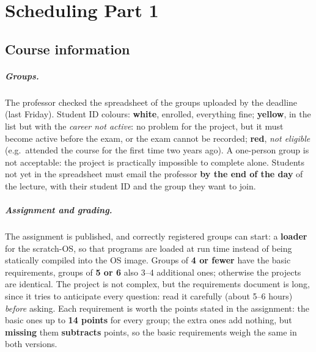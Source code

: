 \chapter{Scheduling Part 1}

\section{Course information}
\paragraph{Groups.} The professor checked the spreadsheet of the groups uploaded by the deadline (last Friday). Student ID colours: \textbf{white}, enrolled, everything fine; \textbf{yellow}, in the list but with the \emph{career not active}: no problem for the project, but it must become active before the exam, or the exam cannot be recorded; \textbf{red}, \emph{not eligible} (e.g.\ attended the course for the first time two years ago). A one-person group is not acceptable: the project is practically impossible to complete alone. Students not yet in the spreadsheet must email the professor \textbf{by the end of the day} of the lecture, with their student ID and the group they want to join.

\paragraph{Assignment and grading.} The assignment is published, and correctly registered groups can start: a \textbf{loader} for the scratch-OS, so that programs are loaded at run time instead of being statically compiled into the OS image. Groups of \textbf{4 or fewer} have the basic requirements, groups of \textbf{5 or 6} also 3--4 additional ones; otherwise the projects are identical. The project is not complex, but the requirements document is long, since it tries to anticipate every question: read it carefully (about 5--6 hours) \emph{before} asking. Each requirement is worth the points stated in the assignment: the basic ones up to \textbf{14 points} for every group; the extra ones add nothing, but \textbf{missing} them \textbf{subtracts} points, so the basic requirements weigh the same in both versions.


